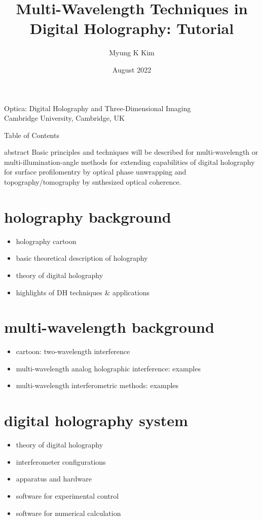 \documentclass[t, aspectratio=169]{beamer}
\title{Multi-Wavelength Techniques in Digital Holography: Tutorial}
\author{Myung K Kim}
\institute{Dept of Physics, University of South Florida, Tampa, FL USA 33620}
\date{August 2022}
\begin{document}
\begin{frame}
	Optica: Digital Holography and Three-Dimensional Imaging\\
	Cambridge University, Cambridge, UK
	\titlepage
\end{frame}


\begin{frame}[allowframebreaks]{Table of Contents}
	\tableofcontents[hideallsubsections]
\end{frame}


\begin{frame}{abstract}
Basic principles and techniques will be described for multi-wavelength or multi-illumination-angle methods for extending capabilities of digital holography for surface profilomentry by optical phase unwrapping and topography/tomography by snthesized optical coherence.
\end{frame}


\section{holography background}
\begin{frame}{\secname}
	\begin{itemize}
		\item holography cartoon
		\item basic theoretical description of holography
		\item theory of digital holography
		\item highlights of DH techniques \& applications
	\end{itemize}
\end{frame}


\section{multi-wavelength background}
\begin{frame}{\secname}
	\begin{itemize}
		\item cartoon: two-wavelength interference
		\item multi-wavelength analog holographic interference: examples
		\item multi-wavelength interferometric methods: examples
	\end{itemize}
\end{frame}


\section{digital holography system}
\begin{frame}{\secname}
	\begin{itemize}
		\item theory of digital holography
		\item interferometer configurations
		\item apparatus and hardware
		\item software for experimental control
		\item software for numerical calculation
	\end{itemize}
\end{frame}
\end{document}
